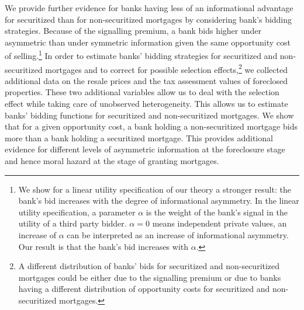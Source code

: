 \documentclass[11pt,twopage]{article}
\begin{document}
We provide further evidence for banks having less of an informational
advantage for securitized than for non-securitized mortgages by
considering bank's bidding strategies. Because of the signalling
premium, a bank bids higher under asymmetric than under symmetric
information given the same opportunity cost of selling.\footnote{We
  show for a linear utility specification of our theory a stronger
  result: the bank's bid increases with the degree of informational
  asymmetry. In the linear utility specification, a parameter $\alpha$
  is the weight of the bank's signal in the utility of a third party
  bidder. $\alpha=0$ means independent private values, an increase of
  $\alpha$ can be interpreted as an increase of informational
  asymmetry. Our result is that the bank's bid increases with
  $\alpha$.} In order to estimate banks' bidding strategies for
securitized and non-securitized mortgages and to correct for possible
selection effects,\footnote{A different distribution of banks' bids
  for securitized and non-securitized mortgages could be either due to
  the signalling premium or due to banks having a different
  distribution of opportunity costs for securitized and
  non-securitized mortgages.} we collected additional data on the
resale prices and the tax assessment values of foreclosed
properties. These two additional variables allow us to deal with the
selection effect while taking care of unobserved heterogeneity. This
allows us to estimate banks' bidding functions for securitized and
non-securitized mortgages. We show that for a given opportunity cost,
a bank holding a non-securitized mortgage bids more than a bank
holding a securitized mortgage. This provides additional evidence for
different levels of asymmetric information at the foreclosure stage
and hence moral hazard at the stage of granting mortgages.
\end{document}

